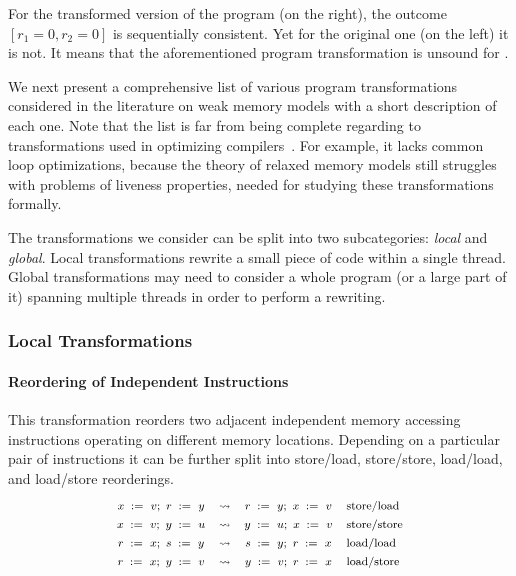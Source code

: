For the transformed version of the program (on the right),
the outcome $[r_1=0, r_2=0]$ is sequentially consistent.
Yet for the original one (on the left) it is not. 
It means that the aforementioned program transformation
is unsound for \SC. 

We next present a comprehensive list of 
various program transformations considered in
the literature on weak memory models 
with a short description of each one.
Note that the list is far from being complete regarding to  
transformations used in optimizing compilers~\cite{Muchnick:ACDI97}.
For example, it lacks common loop optimizations, 
because the theory of relaxed memory models still
struggles with problems of liveness properties, 
needed for studying these transformations formally. 

The transformations we consider can be split into 
two subcategories: \emph{local} and \emph{global}.
Local transformations rewrite a small 
piece of code within a single thread.
Global transformations may need to consider 
a whole program (or a large part of it) 
spanning multiple threads in order 
to perform a rewriting.       
 
\subsubsection{Local Transformations}

\paragraph{Reordering of Independent Instructions} 

This transformation reorders two 
adjacent independent memory accessing instructions
operating on different memory locations.
Depending on a particular pair of instructions
it can be further split into store/load, store/store, 
load/load, and load/store reorderings.  
%
\[\def\arraystretch{1.4}\footnotesize
  \begin{array}{cccl} 

      \writeInst{}{x}{v} \seq \readInst{}{r}{y} 
    & \leadsto 
    & \readInst{}{r}{y} \seq \writeInst{}{x}{v}
    & \text{store/load}  \\ 

      \writeInst{}{x}{v} \seq \writeInst{}{y}{u} 
    & \leadsto 
    & \writeInst{}{y}{u} \seq \writeInst{}{x}{v}
    & \text{store/store}  \\ 

      \readInst{}{r}{x} \seq \readInst{}{s}{y} 
    & \leadsto 
    & \readInst{}{s}{y} \seq \readInst{}{r}{x}
    & \text{load/load}  \\ 

      \readInst{}{r}{x} \seq \writeInst{}{y}{v} 
    & \leadsto 
    & \writeInst{}{y}{v} \seq \readInst{}{r}{x}
    & \text{load/store}  \\ 

  \end{array}
\]

